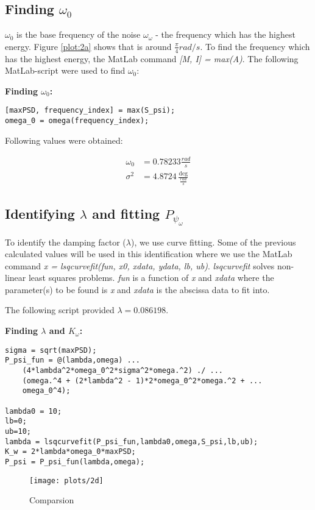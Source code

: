 \subsection{Finding $\omega_0$}

$\omega_0$ is the base frequency of the noise $\omega_\omega$ - the frequency which has the highest energy. Figure \ref{plot:2a} shows that is around $\frac{\pi}{4} rad/s$. To find the frequency which has the highest energy, the MatLab command \textit{[M, I] = max(A)}. The following MatLab-script were used to find $\omega_0$:

\textbf{Finding $\omega_0$:}
\begin{lstlisting}
[maxPSD, frequency_index] = max(S_psi);
omega_0 = omega(frequency_index);
\end{lstlisting}

Following values were obtained:

\begin{align*}
    \omega_0 &= 0.78233 \frac{{rad}}{s}\\
    \sigma^2 &= 4.8724 \frac{{\deg }}{{\frac{{rad}}{s}}}
\end{align*}



\subsection{Identifying $\lambda$ and fitting $P_{\psi_\omega}$}

To identify the damping factor ($\lambda$), we use curve fitting. Some of the previous calculated values will be used in this identification where we use the MatLab command \textit{x = lsqcurvefit(fun, x0, xdata, ydata, lb, ub)}. \textit{lsqcurvefit} solves non-linear least squares problems. \textit{fun} is a function of \textit{x} and \textit{xdata} where the parameter(s) to be found is \textit{x} and \textit{xdata} is the abscissa data to fit into.

The following script provided $\lambda = 0.086198$.

\textbf{Finding $\lambda$ and $K_{\omega}$:}
\begin{lstlisting}
sigma = sqrt(maxPSD);
P_psi_fun = @(lambda,omega) ...
    (4*lambda^2*omega_0^2*sigma^2*omega.^2) ./ ...
    (omega.^4 + (2*lambda^2 - 1)*2*omega_0^2*omega.^2 + ...
    omega_0^4);

lambda0 = 10;
lb=0;
ub=10;
lambda = lsqcurvefit(P_psi_fun,lambda0,omega,S_psi,lb,ub);
K_w = 2*lambda*omega_0*maxPSD;
P_psi = P_psi_fun(lambda,omega);
\end{lstlisting}


\begin{figure}[!htb]
    \caption{Comparsion}
    \centering
    \centerline{\texttt{[image: plots/2d]}}
\label{plot:2d}
\end{figure}

